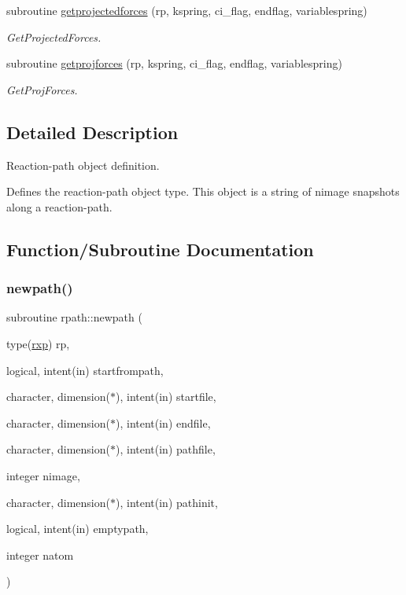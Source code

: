 \begin{DoxyCompactItemize}
subroutine \mbox{\hyperlink{namespacerpath_a94586723a045fa2d44e3f6b6a91d1d50}{getprojectedforces}} (rp, kspring, ci\+\_\+flag, endflag, variablespring)
\begin{DoxyCompactList}\small\item\em Get\+Projected\+Forces. \end{DoxyCompactList}\item 
subroutine \mbox{\hyperlink{namespacerpath_a77818427a2d3efbe627d872dd929e11e}{getprojforces}} (rp, kspring, ci\+\_\+flag, endflag, variablespring)
\begin{DoxyCompactList}\small\item\em Get\+Proj\+Forces. \end{DoxyCompactList}\end{DoxyCompactItemize}


\subsection{Detailed Description}
Reaction-\/path object definition. 

Defines the reaction-\/path object type. This object is a string of nimage snapshots along a reaction-\/path. 

\subsection{Function/\+Subroutine Documentation}
\mbox{\label{namespacerpath_ab6d6281ea4bcaee28c63f8d7d38e746a}} 
\subsubsection{\texorpdfstring{newpath()}{newpath()}}
{\footnotesize\ttfamily subroutine rpath\+::newpath (\begin{DoxyParamCaption}\item[{type(\mbox{\hyperlink{structrpath_1_1rxp}{rxp}})}]{rp,  }\item[{logical, intent(in)}]{startfrompath,  }\item[{character, dimension($\ast$), intent(in)}]{startfile,  }\item[{character, dimension($\ast$), intent(in)}]{endfile,  }\item[{character, dimension($\ast$), intent(in)}]{pathfile,  }\item[{integer}]{nimage,  }\item[{character, dimension($\ast$), intent(in)}]{pathinit,  }\item[{logical, intent(in)}]{emptypath,  }\item[{integer}]{natom }\end{DoxyParamCaption})}



